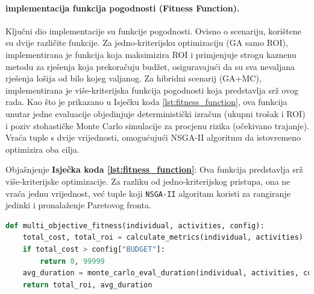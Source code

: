 \paragraph{implementacija funkcija pogodnosti (Fitness Function).}
Ključni dio implementacije su funkcije pogodnosti. Ovisno o scenariju, korištene su dvije različite funkcije. Za jedno-kriterijsku optimizaciju (GA samo ROI), implementirana je funkcija koja maksimizira ROI i primjenjuje strogu kaznenu metodu za rješenja koja prekoračuju budžet, osiguravajući da su sva nevaljana rješenja lošija od bilo kojeg valjanog.
Za hibridni scenarij (GA+MC), implementirana je više-kriterijska funkcija pogodnosti koja predstavlja srž ovog rada. Kao što je prikazano u Isječku koda \ref{lst:fitness_function}, ova funkcija unutar jedne evaluacije objedinjuje deterministički izračun (ukupni trošak i ROI) i poziv stohastičke Monte Carlo simulacije za procjenu rizika (očekivano trajanje). Vraća tuple s dvije vrijednosti, omogućujući NSGA-II algoritmu da istovremeno optimizira oba cilja.

Objašnjenje \textbf{Isječka koda \ref{lst:fitness_function}}:
Ova funkcija predstavlja srž više-kriterijske optimizacije. Za razliku od jedno-kriterijskog pristupa, ona ne vraća jednu vrijednost, već tuple koji \texttt{NSGA-II} algoritam koristi za rangiranje jedinki i pronalaženje Paretovog fronta.

\begin{lstlisting}[float, language=Python, caption={Više-kriterijska funkcija pogodnosti}, label={lst:fitness_function}, captionpos=b ]
def multi_objective_fitness(individual, activities, config):
    total_cost, total_roi = calculate_metrics(individual, activities)
    if total_cost > config["BUDGET"]:
        return 0, 99999
    avg_duration = monte_carlo_eval_duration(individual, activities, config)
    return total_roi, avg_duration
\end{lstlisting}

